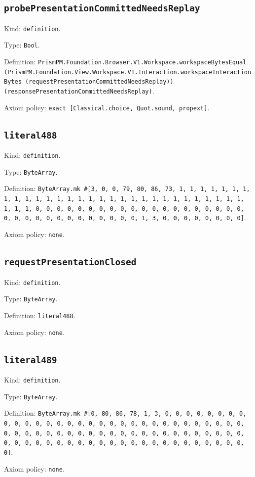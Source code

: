 \documentclass[11pt]{article}
\begin{document}
\subsection*{\texttt{probePresentationCommittedNeedsReplay}}
\noindent Kind: \texttt{definition}.\par
\noindent Type: \texttt{Bool}.\par
\noindent Definition: \texttt{PrismPM.Foundation.Browser.V1.Workspace.workspaceBytesEqual (PrismPM.Foundation.View.Workspace.V1.Interaction.workspaceInteractionBytes (requestPresentationCommittedNeedsReplay)) (responsePresentationCommittedNeedsReplay)}.\par
\noindent Axiom policy: \texttt{exact [Classical.choice, Quot.sound, propext]}.\par
\subsection*{\texttt{literal488}}
\noindent Kind: \texttt{definition}.\par
\noindent Type: \texttt{ByteArray}.\par
\noindent Definition: \texttt{ByteArray.mk \#[3, 0, 0, 79, 80, 86, 73, 1, 1, 1, 1, 1, 1, 1, 1, 1, 1, 1, 1, 1, 1, 1, 1, 1, 1, 1, 1, 1, 1, 1, 1, 1, 1, 1, 1, 1, 1, 1, 1, 1, 0, 0, 0, 0, 0, 0, 0, 0, 0, 0, 0, 0, 0, 0, 0, 0, 0, 0, 0, 0, 0, 0, 0, 0, 0, 0, 0, 0, 0, 0, 0, 0, 0, 1, 3, 0, 0, 0, 0, 0, 0, 0, 0]}.\par
\noindent Axiom policy: \texttt{none}.\par
\subsection*{\texttt{requestPresentationClosed}}
\noindent Kind: \texttt{definition}.\par
\noindent Type: \texttt{ByteArray}.\par
\noindent Definition: \texttt{literal488}.\par
\noindent Axiom policy: \texttt{none}.\par
\subsection*{\texttt{literal489}}
\noindent Kind: \texttt{definition}.\par
\noindent Type: \texttt{ByteArray}.\par
\noindent Definition: \texttt{ByteArray.mk \#[0, 80, 86, 78, 1, 3, 0, 0, 0, 0, 0, 0, 0, 0, 0, 0, 0, 0, 0, 0, 0, 0, 0, 0, 0, 0, 0, 0, 0, 0, 0, 0, 0, 0, 0, 0, 0, 0, 0, 0, 0, 0, 0, 0, 0, 0, 0, 0, 0, 0, 0, 0, 0, 0, 0, 0, 0, 0, 0, 0, 0, 0, 0, 0, 0, 0, 0, 0, 0, 0, 0, 0, 0, 0, 0, 0, 0, 0, 0, 0, 0, 0, 0, 0]}.\par
\noindent Axiom policy: \texttt{none}.\par
\end{document}

